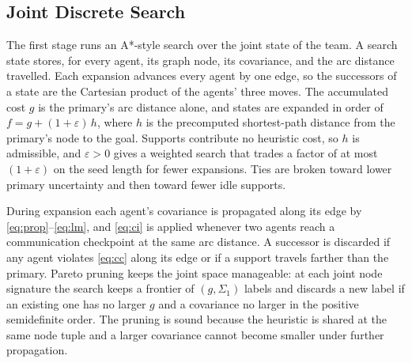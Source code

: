 \documentclass[letterpaper, 10 pt, conference]{ieeeconf}
\theoremstyle{remark}
\begin{document}
\subsection{Joint Discrete Search}

The first stage runs an A*-style search \cite{hart1968astar} over the joint
state of the team. A search state stores, for every agent, its graph node,
its covariance, and the arc distance travelled. Each expansion advances
every agent by one edge, so the successors of a state are the Cartesian
product of the agents' three moves. The accumulated cost $g$ is the
primary's arc distance alone, and states are expanded in order of
$f = g + (1+\varepsilon)\,h$, where $h$ is the precomputed shortest-path
distance from the primary's node to the goal. Supports contribute no
heuristic cost, so $h$ is admissible, and $\varepsilon > 0$ gives a weighted
search \cite{pohl1970weighted} that trades a factor of at most
$(1+\varepsilon)$ on the seed length \cite{pearl1984heuristics} for fewer
expansions. Ties are broken toward lower primary
uncertainty and then toward fewer idle supports.


During expansion each agent's covariance is propagated along its edge by
\eqref{eq:prop}--\eqref{eq:lm}, and \eqref{eq:ci} is applied whenever two
agents reach a communication checkpoint at the same arc distance. A
successor is discarded if any agent violates \eqref{eq:cc} along its edge or
if a support travels farther than the primary. Pareto pruning keeps the
joint space manageable: at each joint node signature the search keeps a
frontier of $(g, \Sigma_1)$ labels and discards a new label if an existing
one has no larger $g$ and a covariance no larger in the positive
semidefinite order. The pruning is sound because the heuristic is shared at
the same node tuple and a larger covariance cannot become smaller under
further propagation.
\end{document}

